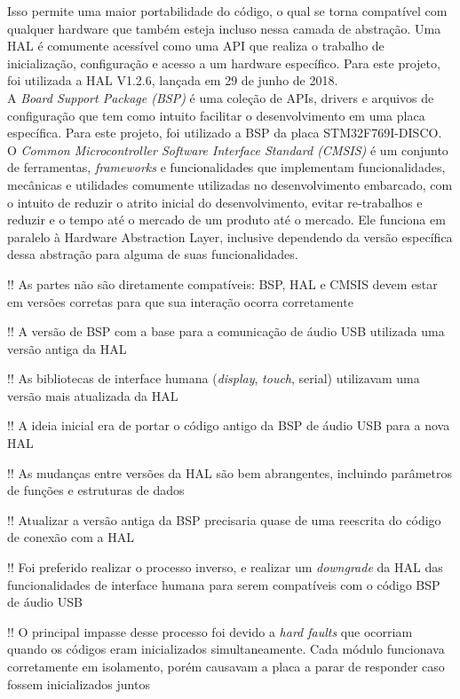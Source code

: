 Isso permite uma maior portabilidade do código, o qual se torna compatível com qualquer hardware que também esteja incluso nessa camada de abstração.
Uma HAL é comumente acessível como uma API que realiza o trabalho de inicialização, configuração e acesso a um hardware específico. Para este projeto, foi utilizada a HAL V1.2.6, lançada em 29 de junho de 2018.
\\[10pt]

A \textit{Board Support Package (BSP)} é uma coleção de APIs, drivers e arquivos de configuração que tem como intuito facilitar o desenvolvimento em uma placa específica. 
Para este projeto, foi utilizado a BSP da placa STM32F769I-DISCO.
\\[10pt]

O \textit{Common Microcontroller Software Interface Standard (CMSIS)} é um conjunto de ferramentas, \textit{frameworks} e funcionalidades que implementam funcionalidades, mecânicas e utilidades comumente utilizadas no desenvolvimento embarcado, com o intuito de reduzir o atrito inicial do desenvolvimento, evitar re-trabalhos e reduzir e o tempo até o mercado de um produto até o mercado. Ele funciona em paralelo à Hardware Abstraction Layer, inclusive dependendo da versão específica dessa abstração para alguma de suas funcionalidades.

!! As partes não são diretamente compatíveis: BSP, HAL e CMSIS devem estar em versões corretas para que sua interação ocorra corretamente

!! A versão de BSP com a base para a comunicação de áudio USB utilizada uma versão antiga da HAL

!! As bibliotecas de interface humana (\textit{display}, \textit{touch}, serial) utilizavam uma versão mais atualizada da HAL

!! A ideia inicial era de portar o código antigo da BSP de áudio USB para a nova HAL

!! As mudanças entre versões da HAL são bem abrangentes, incluindo parâmetros de funções e estruturas de dados

!! Atualizar a versão antiga da BSP precisaria quase de uma reescrita do código de conexão com a HAL

!! Foi preferido realizar o processo inverso, e realizar um \textit{downgrade} da HAL das funcionalidades de interface humana para serem compatíveis com o código BSP de áudio USB

!! O principal impasse desse processo foi devido a \textit{hard faults} que ocorriam quando os códigos eram inicializados simultaneamente. Cada módulo funcionava corretamente em isolamento, porém causavam a placa a parar de responder caso fossem inicializados juntos

